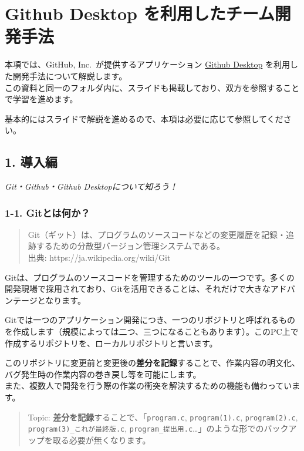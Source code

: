 \section{Github Desktop
を利用したチーム開発手法}\label{github-desktop-ux3092ux5229ux7528ux3057ux305fux30c1ux30fcux30e0ux958bux767aux624bux6cd5}

本項では、GitHub, Inc.~が提供するアプリケーション
\href{https://docs.github.com/ja/desktop}{Github Desktop}
を利用した開発手法について解説します。\\
この資料と同一のフォルダ内に、スライドも掲載しており、双方を参照することで学習を進めます。

基本的にはスライドで解説を進めるので、本項は必要に応じて参照してください。

\subsection{1. 導入編}\label{ux5c0eux5165ux7de8}

\emph{Git・Github・Github Desktopについて知ろう！}

\subsubsection{1-1. Gitとは何か？}\label{gitux3068ux306fux4f55ux304b}

\begin{quote}
Git（ギット）は、プログラムのソースコードなどの変更履歴を記録・追跡するための分散型バージョン管理システムである。\\
出典: https://ja.wikipedia.org/wiki/Git
\end{quote}

Gitは、プログラムのソースコードを管理するためのツールの一つです。多くの開発現場で採用されており、Gitを活用できることは、それだけで大きなアドバンテージとなります。

Gitでは一つのアプリケーション開発につき、一つのリポジトリと呼ばれるものを作成します（規模によっては二つ、三つになることもあります）。このPC上で作成するリポジトリを、ローカルリポジトリと言います。

このリポジトリに変更前と変更後の\textbf{差分を記録}することで、作業内容の明文化、バグ発生時の作業内容の巻き戻し等を可能にします。\\
また、複数人で開発を行う際の作業の衝突を解決するための機能も備わっています。

\begin{quote}
Topic: \textbf{差分を記録}することで、「\texttt{program.c},
\texttt{program(1).c}, \texttt{program(2).c},
\texttt{program(3)\_これが最終版.c},
\texttt{program\_提出用.c}\ldots」のような形でのバックアップを取る必要が無くなります。
\end{quote}

